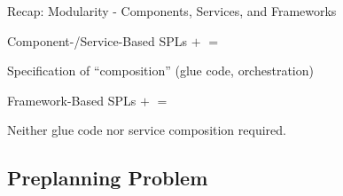 \begin{frame}{Recap: Modularity - Components, Services, and Frameworks} %
	\begin{fancycolumns}[widths={40,60},animation=none]
		\begin{example}{Component-/Service-Based SPLs} %
				\vspace*{\fill}
					$+$ 
				\vspace*{\fill}	
				\vspace*{\fill}
					$=$ 
				\vspace*{\fill}	
		\end{example}	
		\begin{example}{Specification of ``composition'' (glue code, orchestration)}
			\centering
		\end{example}
	\nextcolumn		
		\begin{example}{Framework-Based SPLs}
				\vspace*{\fill}
					$+$ 
				\vspace*{\fill}	
				\vspace*{\fill}
					$=$ 
				\vspace*{\fill}	
		\end{example}
		\begin{note}{}
			Neither glue code nor service composition required.
		\end{note}			
	\end{fancycolumns}	
\end{frame}



\subsection{Preplanning Problem}

